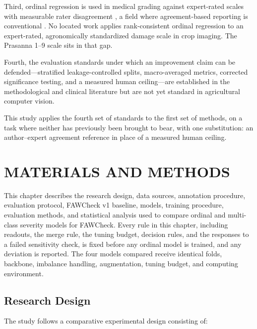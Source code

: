 \documentclass{icsthesis}
\begin{document}
\begin{mainmatter}
				Third, ordinal regression is used in medical grading against expert-rated scales
				with measurable rater disagreement \citep{tang2023,braganca2026,toledo2022}, a field
				where agreement-based reporting is conventional
				\citep{farag2022,xie2023,schaap2022}. No located work applies rank-consistent
				ordinal regression to an expert-rated, agronomically standardized damage scale in
				crop imaging. The Prasanna 1--9 scale sits in that gap.

				Fourth, the evaluation standards under which an improvement claim can be
				defended---stratified leakage-controlled splits, macro-averaged metrics, corrected
				significance testing, and a measured human ceiling---are established in the
				methodological and clinical literature
				\citep{gutierrez2016,noyan2022,baccianella2009,dietterich1998,%
				nadeau2003,bouckaert2004,schaap2022}
				but are not yet standard in agricultural computer vision.

				This study applies the fourth set of standards to the first set of methods, on a
				task where neither has previously been brought to bear, with one substitution: an
				author--expert agreement reference in place of a measured human ceiling.

		\section{MATERIALS AND METHODS}\label{sec:methods}

			This chapter describes the research design, data sources, annotation procedure,
			evaluation protocol, FAWCheck v1 baseline, models, training procedure, evaluation methods, and statistical analysis used to compare
			ordinal and multi-class severity models for FAWCheck. Every rule in this chapter,
			including readouts, the merge rule, the tuning budget, decision rules, and the
			responses to a failed sensitivity check, is fixed before any ordinal model is
			trained, and any deviation is reported. The four models compared receive identical
			folds, backbone, imbalance handling, augmentation, tuning budget, and computing
			environment.

			\subsection{Research Design}\label{sec:design}

				The study follows a comparative experimental design consisting of:


\end{mainmatter}
\end{document}
